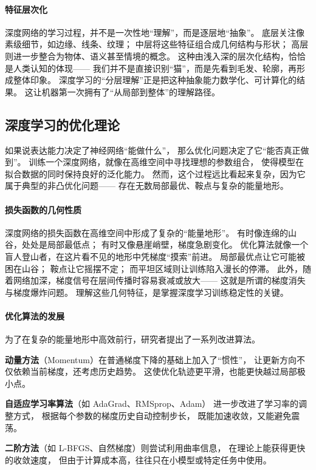 \paragraph{特征层次化}  
深度网络的学习过程，并不是一次性地“理解”，而是逐层地“抽象”。  
底层关注像素级细节，如边缘、线条、纹理；  
中层将这些特征组合成几何结构与形状；  
高层则进一步整合为物体、语义甚至情境的概念。  
这种由浅入深的层次化结构，恰恰是人类认知的体现——  
我们并不是直接识别“猫”，而是先看到毛发、轮廓，再形成整体印象。  
深度学习的“分层理解”正是把这种抽象能力数学化、可计算化的结果。  
这让机器第一次拥有了“从局部到整体”的理解路径。

\subsection{深度学习的优化理论}

如果说表达能力决定了神经网络“能做什么”，  
那么优化问题决定了它“能否真正做到”。  
训练一个深度网络，就像在高维空间中寻找理想的参数组合，  
使得模型在拟合数据的同时保持良好的泛化能力。  
然而，这个过程远比看起来复杂，因为它属于典型的非凸优化问题——  
存在无数局部最优、鞍点与复杂的能量地形。

\paragraph{损失函数的几何性质}  
深度网络的损失函数在高维空间中形成了复杂的“能量地形”。  
有时像连绵的山谷，处处是局部最低点；  
有时又像悬崖峭壁，梯度急剧变化。  
优化算法就像一个盲人登山者，在这片看不见的地形中凭梯度“摸索”前进。  
局部最优点让它可能被困在山谷；  
鞍点让它摇摆不定；  
而平坦区域则让训练陷入漫长的停滞。  
此外，随着网络加深，梯度信号在层间传播时容易衰减或放大——  
这就是所谓的梯度消失与梯度爆炸问题。  
理解这些几何特征，是掌握深度学习训练稳定性的关键。

\paragraph{优化算法的发展}  
为了在复杂的能量地形中高效前行，研究者提出了一系列改进算法。  

{\bf 动量方法}（Momentum）在普通梯度下降的基础上加入了“惯性”，  
让更新方向不仅依赖当前梯度，还考虑历史趋势。  
这使优化轨迹更平滑，也能更快越过局部极小点。  

{\bf 自适应学习率算法}（如 AdaGrad、RMSprop、Adam）  
进一步改进了学习率的调整方式，  
根据每个参数的梯度历史自动控制步长，  
既能加速收敛，又能避免震荡。  

{\bf 二阶方法}（如 L-BFGS、自然梯度）则尝试利用曲率信息，  
在理论上能获得更快的收敛速度，  
但由于计算成本高，往往只在小模型或特定任务中使用。  

